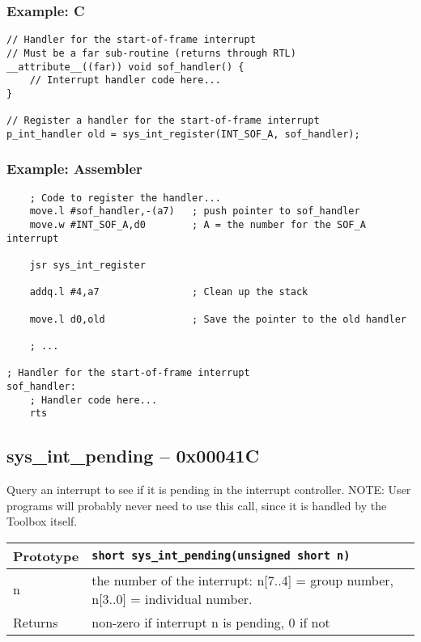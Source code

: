 \subsubsection*{Example: C}
\begin{lstlisting}
// Handler for the start-of-frame interrupt
// Must be a far sub-routine (returns through RTL)
__attribute__((far)) void sof_handler() {
    // Interrupt handler code here...
}

// Register a handler for the start-of-frame interrupt
p_int_handler old = sys_int_register(INT_SOF_A, sof_handler);
\end{lstlisting}

\subsubsection*{Example: Assembler}
\begin{verbatim}
    ; Code to register the handler...
    move.l #sof_handler,-(a7)   ; push pointer to sof_handler
    move.w #INT_SOF_A,d0        ; A = the number for the SOF_A interrupt
    
    jsr sys_int_register

    addq.l #4,a7                ; Clean up the stack

    move.l d0,old               ; Save the pointer to the old handler

    ; ...

; Handler for the start-of-frame interrupt
sof_handler:
    ; Handler code here...
    rts
\end{verbatim}

\subsection*{sys\_int\_pending -- 0x00041C}
Query an interrupt to see if it is pending in the interrupt controller.
NOTE: User programs will probably never need to use this call, since it is handled by the Toolbox itself.

\bigskip

\begin{tabular}{|l||l|} \hline
Prototype & \lstinline!short sys_int_pending(unsigned short n)! \\ \hline
n & the number of the interrupt: n[7..4] = group number, n[3..0] = individual number. \\ \hline
Returns & non-zero if interrupt n is pending, 0 if not \\ \hline
\end{tabular}


